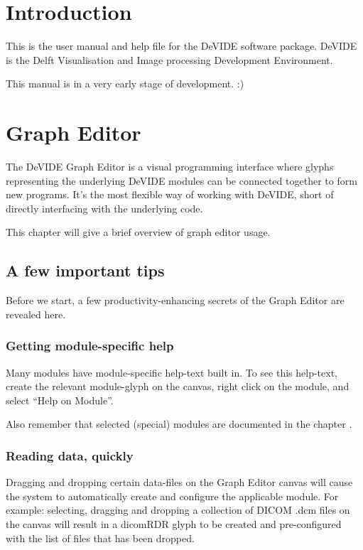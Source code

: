 \chapter{Introduction}%
%
%
\setfooter{\thepage}{}{}{}{}{\thepage}%
This is the user manual and help file for the DeVIDE software package.
DeVIDE is the Delft Visualisation and Image processing Development
Environment.

This manual is in a very early stage of development. :)

\chapter{Graph Editor}
%
%
\setfooter{\thepage}{}{}{}{}{\thepage}%

The DeVIDE Graph Editor is a visual programming interface where glyphs
representing the underlying DeVIDE modules can be connected together
to form new programs.  It's the most flexible way of working with
DeVIDE, short of directly interfacing with the underlying code.

This chapter will give a brief overview of graph editor usage.

\section{A few important tips}
Before we start, a few productivity-enhancing secrets of the Graph
Editor are revealed here.

\subsection{Getting module-specific help}
Many modules have module-specific help-text built in.  To see this
help-text, create the relevant module-glyph on the canvas, right click
on the module, and select ``Help on Module''.

Also remember that selected (special) modules are documented in the
chapter .

\subsection{Reading data, quickly}
Dragging and dropping certain data-files on the Graph Editor canvas
will cause the system to automatically create and configure the
applicable module.  For example: selecting, dragging and dropping a
collection of DICOM .dcm files on the canvas will result in a dicomRDR
glyph to be created and pre-configured with the list of files that has
been dropped.

